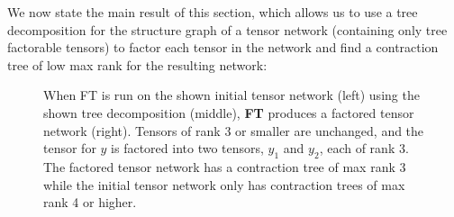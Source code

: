We now state the main result of this section, which allows us to use a tree decomposition for the structure graph of a tensor network (containing only tree factorable tensors) to factor each tensor in the network and find a contraction tree of low max rank for the resulting network:
\begin{figure}[t]
	\centering
	
	\hspace{1cm}
	
	\hspace{1cm}
	
	\caption{\label{fig:factor-example} When FT is run on the shown initial tensor network (left) using the shown tree decomposition (middle), \textbf{FT} produces a factored tensor network (right). Tensors of rank 3 or smaller are unchanged, and the tensor for $y$ is factored into two tensors, $y_1$ and $y_2$, each of rank 3. The factored tensor network has a contraction tree of max rank 3 while the initial tensor network only has contraction trees of max rank 4 or higher.}
\end{figure}

